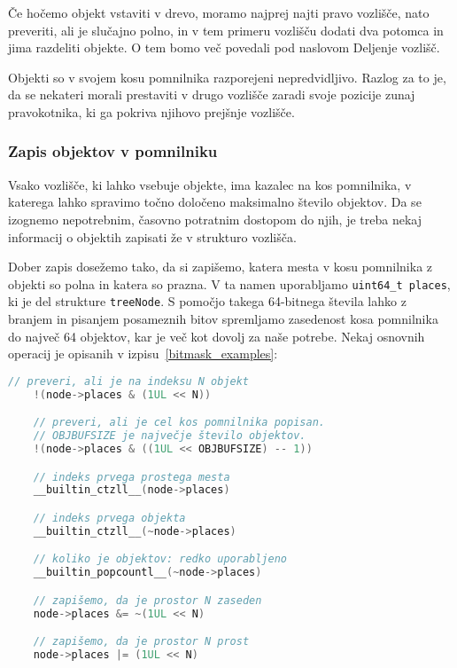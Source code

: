 \documentclass[a4paper,12pt]{article}
\begin{document}
Če hočemo objekt vstaviti v drevo, moramo najprej najti pravo vozlišče, nato preveriti,
ali je slučajno polno, in v tem primeru vozlišču dodati dva potomca in jima razdeliti objekte.
O tem bomo več povedali pod naslovom Deljenje vozlišč.

Objekti so v svojem kosu pomnilnika razporejeni nepredvidljivo. Razlog za to je, da se nekateri
morali prestaviti v drugo vozlišče zaradi svoje pozicije zunaj pravokotnika, ki ga pokriva
njihovo prejšnje vozlišče.
\subsubsection{Zapis objektov v pomnilniku}
Vsako vozlišče, ki lahko vsebuje objekte, ima kazalec na kos pomnilnika, v katerega lahko spravimo
točno določeno maksimalno število objektov. Da se izognemo nepotrebnim, časovno potratnim dostopom
do njih, je treba nekaj informacij o objektih zapisati že v strukturo vozlišča.

Dober zapis dosežemo tako, da si zapišemo, katera mesta v kosu pomnilnika z objekti
so polna in katera so prazna. V ta namen uporabljamo \lstinline|uint64_t places|, ki je del strukture 
\lstinline|treeNode|. S pomočjo takega 64-bitnega števila lahko z branjem in pisanjem posameznih bitov
spremljamo zasedenost kosa pomnilnika do največ 64 objektov, kar je več kot dovolj za naše potrebe. 
Nekaj osnovnih operacij je opisanih v izpisu~\ref{bitmask_examples}:
\begin{lstlisting}[caption={Uporaba bitne maske za objekte}, label=bitmask_examples, language=C]
    // preveri, ali je na indeksu N objekt
    !(node->places & (1UL << N))

    // preveri, ali je cel kos pomnilnika popisan.
    // OBJBUFSIZE je največje število objektov.
    !(node->places & ((1UL << OBJBUFSIZE) -- 1)) 

    // indeks prvega prostega mesta
    __builtin_ctzll__(node->places)

    // indeks prvega objekta
    __builtin_ctzll__(~node->places)

    // koliko je objektov: redko uporabljeno
    __builtin_popcountl__(~node->places)

    // zapišemo, da je prostor N zaseden
    node->places &= ~(1UL << N)

    // zapišemo, da je prostor N prost
    node->places |= (1UL << N)

\end{lstlisting}
\end{document}
